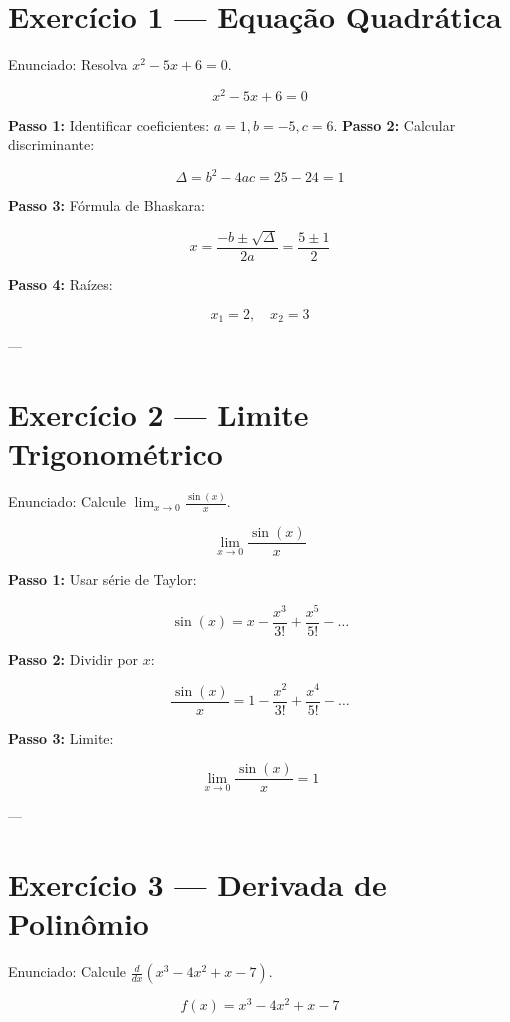 
\section*{Exercício 1 — Equação Quadrática}
Enunciado: Resolva \(x^2 - 5x + 6 = 0\).



\[
x^2 - 5x + 6 = 0
\]



\textbf{Passo 1:} Identificar coeficientes: \(a=1, b=-5, c=6\).  
\textbf{Passo 2:} Calcular discriminante:


\[
\Delta = b^2 - 4ac = 25 - 24 = 1
\]


\textbf{Passo 3:} Fórmula de Bhaskara:


\[
x = \frac{-b \pm \sqrt{\Delta}}{2a} = \frac{5 \pm 1}{2}
\]


\textbf{Passo 4:} Raízes:


\[
x_1 = 2, \quad x_2 = 3
\]



---

\section*{Exercício 2 — Limite Trigonométrico}
Enunciado: Calcule \(\lim_{x \to 0} \frac{\sin(x)}{x}\).



\[
\lim_{x \to 0} \frac{\sin(x)}{x}
\]



\textbf{Passo 1:} Usar série de Taylor:


\[
\sin(x) = x - \frac{x^3}{3!} + \frac{x^5}{5!} - \dots
\]


\textbf{Passo 2:} Dividir por \(x\):


\[
\frac{\sin(x)}{x} = 1 - \frac{x^2}{3!} + \frac{x^4}{5!} - \dots
\]


\textbf{Passo 3:} Limite:


\[
\lim_{x \to 0} \frac{\sin(x)}{x} = 1
\]



---

\section*{Exercício 3 — Derivada de Polinômio}
Enunciado: Calcule \(\frac{d}{dx}(x^3 - 4x^2 + x - 7)\).



\[
f(x) = x^3 - 4x^2 + x - 7
\]



